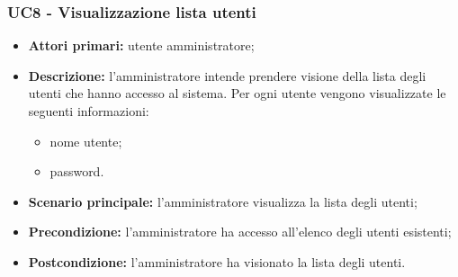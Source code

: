 
\subsubsection{UC8 - Visualizzazione lista utenti}
\begin{itemize}
	\item \textbf{Attori primari:} utente amministratore;
	\item \textbf{Descrizione:} l'amministratore intende prendere visione della lista degli utenti che hanno accesso al sistema. Per ogni utente vengono visualizzate le seguenti informazioni:
		\begin{itemize}
			\item nome utente;
			\item password.
		\end{itemize}
	\item \textbf{Scenario principale:} l'amministratore visualizza la lista degli utenti;
	\item \textbf{Precondizione:} l'amministratore ha accesso all'elenco degli utenti esistenti;
	\item \textbf{Postcondizione:} l'amministratore ha visionato la lista degli utenti.
\end{itemize}

